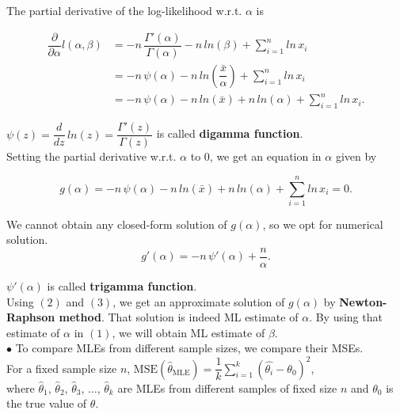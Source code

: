 \documentclass[11pt, a4paper]{article}\usepackage[]{graphicx}\usepackage[]{xcolor}
\begin{document}
The partial derivative of the log-likelihood w.r.t. $\alpha$ is

\begin{align*}
\dfrac{\partial}{\partial \alpha} l(\alpha, \beta) &= -n \, \dfrac{\Gamma'(\alpha)}{\Gamma(\alpha)} - n \, ln(\beta) + \sum \limits_{i = 1}^{n} ln \, x_i \\
&= -n \, \psi(\alpha) - n \, ln\left(\dfrac{\bar{x}}{\alpha}\right) + \sum \limits_{i = 1}^{n} ln \, x_i \\
&= -n \, \psi(\alpha) - n \, ln(\bar{x}) + n \, ln(\alpha) + \sum \limits_{i = 1}^{n} ln \, x_i.
\end{align*}

$\psi(z) = \dfrac{d}{dz} \, ln(z) = \dfrac{\Gamma'(z)}{\Gamma(z)}$ is called \textbf{digamma function}. \\

Setting the partial derivative w.r.t. $\alpha$ to 0, we get an equation in $\alpha$ given by

\begin{equation}
g(\alpha) = - n \, \psi(\alpha) - n \, ln(\bar{x}) + n \, ln(\alpha) + \sum \limits_{i = 1}^{n} ln \, x_i = 0.
\end{equation}

We cannot obtain any closed-form solution of $g(\alpha)$, so we opt for numerical solution. \\

\begin{equation}
g'(\alpha) = - n \, \psi'(\alpha) + \dfrac{n}{\alpha}.
\end{equation}

$\psi'(\alpha)$ is called \textbf{trigamma function}. \\

Using $(2)$ and $(3)$, we get an approximate solution of $g(\alpha)$ by \textbf{Newton-Raphson method}. That solution is indeed ML estimate of $\alpha$. By using that estimate of $\alpha$ in $(1)$, we will obtain ML estimate of $\beta$. \\

$\bullet$ To compare MLEs from different sample sizes, we compare their MSEs. \\

For a fixed sample size $n$, $\text{MSE}(\hat{\theta}_{\text{MLE}}) = \dfrac{1}{k} \sum \limits_{i = 1}^{k} (\hat{\theta_i} - \theta_0)^2$, \\
where $\hat{\theta}_1$, $\hat{\theta}_2$, $\hat{\theta}_3$, $\ldots$, $\hat{\theta}_k$ are MLEs from different samples of fixed size $n$ and $\theta_0$ is the true value of $\theta$.
\end{document}
